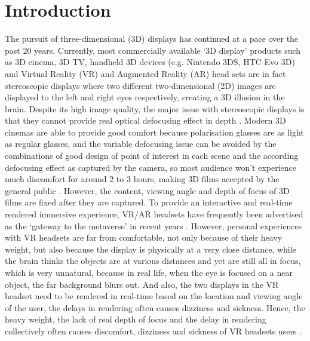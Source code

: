 
\chapter{Introduction}
\graphicspath{{Chapter_Intro/Figs/}}

The pursuit of three-dimensional (3D) displays has continued at a pace over the past 20 years. Currently, most commercially available `3D display' products such as 3D cinema, 3D TV, handheld 3D devices (e.g. Nintendo 3DS, HTC Evo 3D) and Virtual Reality (VR) and Augmented Reality (AR) head sets are in fact stereoscopic displays \cite{McIntire2014} where two different two-dimensional (2D) images are displayed to the left and right eyes respectively, creating a 3D illusion in the brain. Despite its high image quality, the major issue with stereoscopic displays is that they cannot provide real optical defocusing effect in depth \cite{Watt2005}. Modern 3D cinemas are able to provide good comfort because polarisation glasses are as light as regular glasses, and the variable defocusing issue can be avoided by the combinations of good design of point of interest in each scene and the according defocusing effect as captured by the camera, so most audience won't experience much discomfort for around 2 to 3 hours, making 3D films accepted by the general public \cite{Barbara2013}. However, the content, viewing angle and depth of focus of 3D films are fixed after they are captured. To provide an interactive and real-time rendered immersive experience, VR/AR headsets have frequently been advertised as the `gateway to the metaverse' in recent years \cite{IET_metaverse_report2022}. However, personal experiences with VR headsets are far from comfortable, not only because of their heavy weight, but also because the display is physically at a very close distance, while the brain thinks the objects are at various distances and yet are still all in focus, which is very unnatural, because in real life, when the eye is focused on a near object, the far background blurs out. And also, the two displays in the VR headset need to be rendered in real-time based on the location and viewing angle of the user, the delays in rendering often causes dizziness and sickness. Hence, the heavy weight, the lack of real depth of focus and the delay in rendering collectively often causes discomfort, dizziness and sickness of VR headsets users \cite{McCauley1992, Chang2020}.

